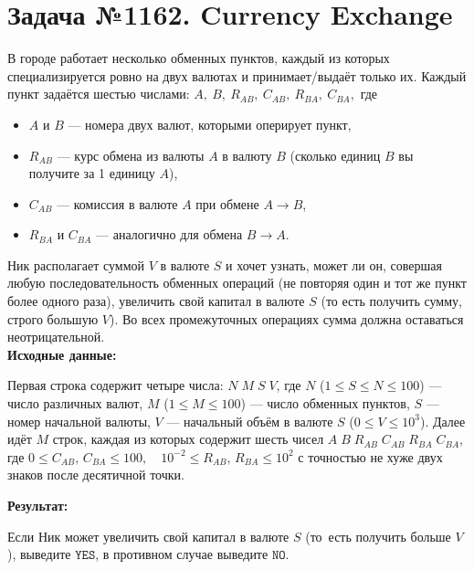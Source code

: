 \documentclass[a4paper,12pt]{article}
\begin{document}
\section*{Задача №1162. Currency Exchange}
В городе работает несколько обменных пунктов, каждый из которых специализируется ровно на двух валютах и принимает/выдаёт только их. Каждый пункт задаётся шестью числами: $A,\ B,\ R_{AB},\ C_{AB},\ R_{BA},\ C_{BA},$ где
\begin{itemize}
  \item \(A\) и \(B\) — номера двух валют, которыми оперирует пункт,
  \item \(R_{AB}\) — курс обмена из валюты \(A\) в валюту \(B\) (сколько единиц \(B\) вы получите за 1 единицу \(A\)),
  \item \(C_{AB}\) — комиссия в валюте \(A\) при обмене \(A \to B\),
  \item \(R_{BA}\) и \(C_{BA}\) — аналогично для обмена \(B \to A\).
\end{itemize}
Ник располагает суммой \(V\) в валюте \(S\) и хочет узнать, может ли он, совершая любую последовательность обменных операций (не повторяя один и тот же пункт более одного раза), увеличить свой капитал в валюте \(S\) (то есть получить сумму, строго большую \(V\)). Во всех промежуточных операциях сумма должна оставаться неотрицательной.\\[1em]
\textbf{Исходные данные:}
\begin{quotebox}
    Первая строка содержит четыре числа: $N\;M\;S\;V$, где \(N\) (\(1 \le S \le N \le 100\)) — число различных валют, \(M\) (\(1 \le M \le 100\)) — число обменных пунктов, \(S\) — номер начальной валюты, \(V\) — начальный объём в валюте \(S\) (\(0 \le V \le 10^3\)). Далее идёт \(M\) строк, каждая из которых содержит шесть чисел $A\;B\;R_{AB}\;C_{AB}\;R_{BA}\;C_{BA},$ где $0 \le C_{AB},\,C_{BA} \le 100,\quad 10^{-2} \le R_{AB},\,R_{BA} \le 10^2$ с точностью не хуже двух знаков после десятичной точки.
\end{quotebox}
\textbf{Результат:}
\begin{quotebox}
    Если Ник может увеличить свой капитал в валюте \(S\) (то есть получить больше \(V\)), выведите $\texttt{YES}$, в противном случае выведите $\texttt{NO}$.
\end{quotebox}
\end{document}
